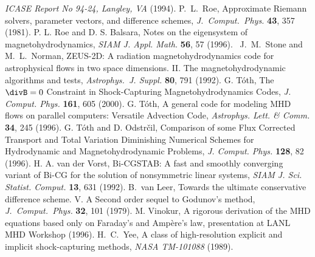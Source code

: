 \begin{thebibliography}{33}
    {\it ICASE Report No 94-24, Langley, VA} (1994).
    P.\ L.\ Roe,
    Approximate Riemann solvers, parameter vectors, 
    and difference schemes,
    {\it J.\ Comput.\ Phys.} {\bf 43}, 357 (1981).
    P. L. Roe and D. S. Balsara, 
    Notes on the eigensystem of magnetohydrodynamics,
    {\it SIAM J. Appl. Math.} {\bf 56}, 57 (1996).\
    J.\ M.\ Stone and M.\ L.\ Norman, 
    ZEUS-2D: A radiation magnetohydrodynamics code for 
    astrophysical flows in two space dimensions.
    II. The magnetohydrodynamic algorithms and tests,
    {\it Astrophys.\ J. Suppl.} {\bf 80}, 791 (1992).
    G. T\'oth,
    The $\divB=0$ Constraint in Shock-Capturing Magnetohydrodynamics Codes,
    {\it J. Comput. Phys.} {\bf 161}, 605 (2000).
    G. T\'oth,
    A general code for modeling MHD flows on parallel computers:
    Versatile Advection Code,
    {\it Astrophys. Lett. \& Comm.} {\bf 34}, 245 (1996).
    G. T\'oth and D. Odstr\v cil,
    Comparison of some Flux Corrected Transport
    and Total Variation Diminishing Numerical Schemes
    for Hydrodynamic and Magnetohydrodynamic Problems,
    {\it J. Comput. Phys.} {\bf 128}, 82 (1996).
    H. A. van der Vorst,
    Bi-CGSTAB: A fast and smoothly converging variant of Bi-CG
    for the solution of nonsymmetric linear systems,
    {\it SIAM J. Sci. Statist. Comput.} {\bf 13}, 631 (1992).
    B.\ van Leer,
    Towards the ultimate conservative difference scheme. 
    V. A Second order sequel to Godunov's method,
    {\it J.\ Comput.\ Phys.} {\bf 32}, 101 (1979).
    M. Vinokur,
    A rigorous derivation of the MHD equations based only on 
    Faraday's and Amp\`ere's law,
    presentation at LANL MHD Workshop (1996).
    H.\ C.\ Yee,
    A class of high-resolution explicit and implicit shock-capturing methods,
    {\it NASA TM-101088} (1989).

\end{thebibliography}


